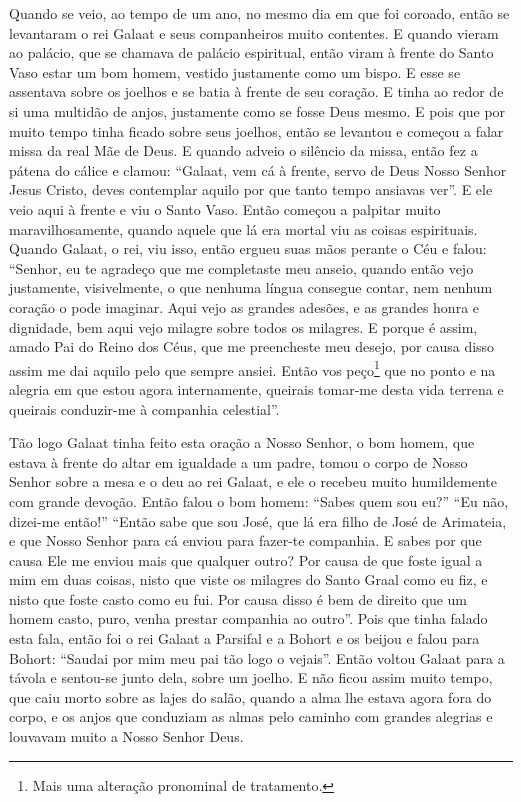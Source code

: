 Quando se veio, ao tempo de um ano, no mesmo dia em que foi coroado, então se
levantaram o rei Galaat e seus companheiros muito contentes. E quando vieram ao
palácio, que se chamava de palácio espiritual, então viram à frente do Santo
Vaso estar um bom homem, vestido justamente como um bispo. E esse se assentava
sobre os joelhos e se batia à frente de seu coração. E tinha ao redor de si uma
multidão de anjos, justamente como se fosse Deus mesmo. E pois que por muito
tempo tinha ficado sobre seus joelhos, então se levantou e começou a falar
missa da real Mãe de Deus. E quando adveio o silêncio da missa, então fez a
pátena do cálice e clamou: “Galaat, vem cá à frente, servo de Deus Nosso Senhor
Jesus Cristo, deves contemplar aquilo por que tanto tempo ansiavas ver”. E ele
veio aqui à frente e viu o Santo Vaso. Então começou a palpitar muito
maravilhosamente, quando aquele que lá era mortal viu as coisas espirituais.
Quando Galaat, o rei, viu isso, então ergueu suas mãos perante o Céu e falou:
“Senhor, eu te agradeço que me completaste meu anseio, quando então vejo
justamente, visivelmente, o que nenhuma língua consegue contar, nem nenhum
coração o pode imaginar. Aqui vejo as grandes adesões, e as grandes honra e
dignidade, bem aqui vejo milagre sobre todos os milagres. E porque é assim,
amado Pai do Reino dos Céus, que me preencheste meu desejo, por causa disso
assim me dai aquilo pelo que sempre ansiei. Então vos peço\footnote{ Mais uma
alteração pronominal de tratamento.} que no ponto e na alegria em
que estou agora internamente, queirais tomar-me desta vida terrena e queirais
conduzir-me à companhia celestial”.

Tão logo Galaat tinha feito esta oração a Nosso Senhor, o bom homem, que estava
à frente do altar em igualdade a um padre, tomou o corpo de Nosso Senhor sobre
a mesa e o deu ao rei Galaat, e ele o recebeu muito humildemente com grande
devoção. Então falou o bom homem: “Sabes quem sou eu?” “Eu não, dizei-me
então!” “Então sabe que sou José, que lá era filho de José de Arimateia, e que
Nosso Senhor para cá enviou para fazer-te companhia. E sabes por que causa Ele
me enviou mais que qualquer outro? Por causa de que foste igual a mim em duas
coisas, nisto que viste os milagres do Santo Graal como eu fiz, e nisto que
foste casto como eu fui. Por causa disso é bem de direito que um homem casto,
puro, venha prestar companhia ao outro”. Pois que tinha falado esta
fala, então foi o rei Galaat a Parsifal e a Bohort e os beijou e falou para
Bohort: “Saudai por mim meu pai tão logo o vejais”. Então voltou Galaat para a
távola e sentou-se junto dela, sobre um joelho. E não ficou assim muito tempo,
que caiu morto sobre as lajes do salão, quando a alma lhe estava agora fora do
corpo, e os anjos que conduziam as almas pelo caminho com grandes alegrias e
louvavam muito a Nosso Senhor Deus.

